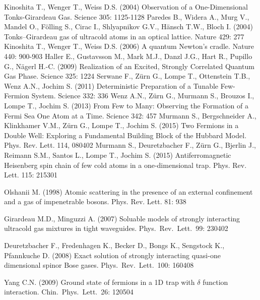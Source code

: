 \begin{thebibliography}{3}
%
%
Kinoshita T., Wenger T., Weiss D.S. (2004) Observation of a One-Dimensional Tonks-Girardeau Gas.  Science 305: 1125-1128
Paredes B., Widera A., Murg V., Mandel O., F\"olling S., Cirac I., Shlyapnikov G.V., H\"ansch T.W., Bloch I. (2004) Tonks–Girardeau gas of ultracold atoms in an optical lattice. Nature 429: 277
Kinoshita T., Wenger T., Weiss D.S. (2006) A quantum Newton's cradle. Nature 440: 900-903
Haller E., Gustavsson M., Mark M.J., Danzl J.G., Hart R., Pupillo G., N\"agerl H.-C. (2009) Realization of an Excited, Strongly Correlated Quantum Gas Phase. Science 325: 1224
%
Serwane F., Z\"urn G., Lompe T., Ottenstein T.B., Wenz A.N., Jochim S. (2011) Deterministic Preparation of a Tunable Few-Fermion System. Science 332: 336
%
Wenz A.N., Z\"urn G., Murmann S., Brouzos I., Lompe T., Jochim S. (2013) From Few to Many: Observing the Formation of a Fermi Sea One Atom at a Time. Science 342: 457
%
Murmann S., Bergschneider A., Klinkhamer V.M., Z\"urn G., Lompe T., Jochim S. (2015) Two Fermions in a Double Well: Exploring a Fundamental Building Block of the Hubbard Model. Phys. Rev. Lett. 114, 080402
%
Murmann S., Deuretzbacher F., Z\"urn G., Bjerlin J., Reimann S.M., Santos L., Lompe T., Jochim S. (2015) Antiferromagnetic Heisenberg spin chain of few cold atoms in a one-dimensional trap.
Phys. Rev. Lett. 115: 215301

Olshanii M. (1998) Atomic scattering in the presence of an external confinement and a gas of impenetrable bosons. Phys. Rev. Lett. 81: 938

 Girardeau M.D., Minguzzi A. (2007) Soluable models of strongly interacting ultracold gas mixtures in tight waveguides. Phys.\ Rev.\ Lett.\ 99: 230402 

 Deuretzbacher F., Fredenhagen K., Becker D., Bongs K., Sengstock K., Pfannkuche D. (2008) Exact solution of strongly interacting quasi-one dimensional spinor Bose gases. Phys.\ Rev.\ Lett.\ 100: 160408 

 Yang C.N. (2009) Ground state of fermions in a 1D trap with $\delta$ function interaction. Chin.\ Phys.\ Lett.\ 26: 120504 


\end{thebibliography}
